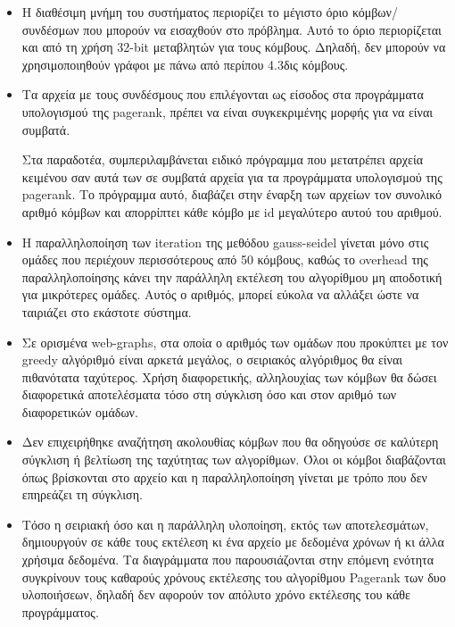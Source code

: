 \begin{itemize}[leftmargin=*]
\item Η διαθέσιμη μνήμη του συστήματος περιορίζει το μέγιστο όριο κόμβων/συνδέσμων που μπορούν να εισαχθούν στο πρόβλημα. Αυτό το όριο περιορίζεται και από τη χρήση 32-bit μεταβλητών για τους κόμβους. Δηλαδή, δεν μπορούν να χρησιμοποιηθούν γράφοι με πάνω από περίπου 4.3δις κόμβους.
\item Τα αρχεία με τους συνδέσμους που επιλέγονται ως είσοδος στα προγράμματα υπολογισμού της pagerank, πρέπει να είναι συγκεκριμένης μορφής για να είναι συμβατά.

Στα παραδοτέα, συμπεριλαμβάνεται ειδικό πρόγραμμα που μετατρέπει αρχεία κειμένου σαν αυτά των \textcite{snapnets} σε συμβατά αρχεία για τα προγράμματα υπολογισμού της pagerank. Το πρόγραμμα αυτό, διαβάζει στην έναρξη των αρχείων τον συνολικό αριθμό κόμβων και απορρίπτει κάθε κόμβο με id μεγαλύτερο αυτού του αριθμού.

\item Η παραλληλοποίηση των iteration της μεθόδου gauss-seidel γίνεται μόνο στις ομάδες που περιέχουν περισσότερους από 50 κόμβους, καθώς το overhead της παραλληλοποίησης κάνει την παράλληλη εκτέλεση του αλγορίθμου μη αποδοτική για μικρότερες ομάδες. Αυτός ο αριθμός, μπορεί εύκολα να αλλάξει ώστε να ταιριάζει στο εκάστοτε σύστημα.

\item Σε ορισμένα web-graphs, στα οποία ο αριθμός των ομάδων που προκύπτει με τον greedy αλγόριθμό είναι αρκετά μεγάλος, ο σειριακός αλγόριθμος θα είναι πιθανότατα ταχύτερος. Χρήση διαφορετικής, αλληλουχίας των κόμβων θα δώσει διαφορετικά αποτελέσματα τόσο στη σύγκλιση όσο και στον αριθμό των διαφορετικών ομάδων.

\item Δεν επιχειρήθηκε αναζήτηση ακολουθίας κόμβων που θα οδηγούσε σε καλύτερη σύγκλιση ή βελτίωση της ταχύτητας των αλγορίθμων. Όλοι οι κόμβοι διαβάζονται όπως βρίσκονται στο αρχείο και η παραλληλοποίηση γίνεται με τρόπο που δεν επηρεάζει τη σύγκλιση.

\item Τόσο η σειριακή όσο και η παράλληλη υλοποίηση, εκτός των αποτελεσμάτων, δημιουργούν σε κάθε τους εκτέλεση κι ένα αρχείο με δεδομένα χρόνων ή κι άλλα χρήσιμα δεδομένα. Τα διαγράμματα που παρουσιάζονται στην επόμενη ενότητα συγκρίνουν τους καθαρούς χρόνους εκτέλεσης του αλγορίθμου Pagerank των δυο υλοποιήσεων, δηλαδή δεν αφορούν τον απόλυτο χρόνο εκτέλεσης του κάθε προγράμματος.
\end{itemize}


